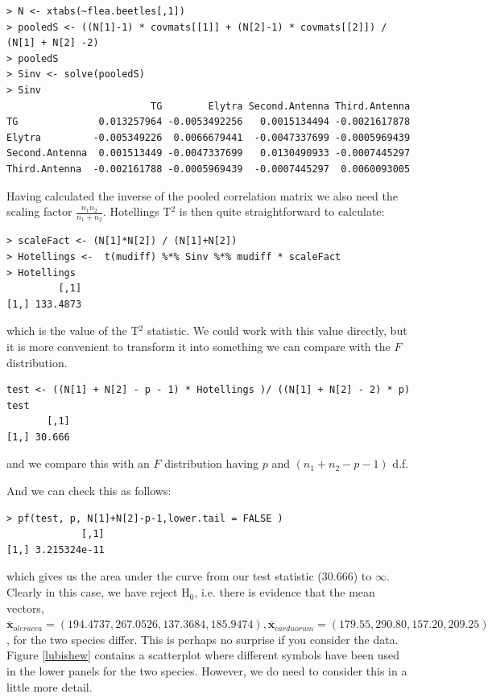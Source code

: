 \singlespacing
\begin{verbatim}
> N <- xtabs(~flea.beetles[,1])
> pooledS <- ((N[1]-1) * covmats[[1]] + (N[2]-1) * covmats[[2]]) / (N[1] + N[2] -2)
> pooledS
> Sinv <- solve(pooledS)
> Sinv
                         TG        Elytra Second.Antenna Third.Antenna
TG              0.013257964 -0.0053492256   0.0015134494 -0.0021617878
Elytra         -0.005349226  0.0066679441  -0.0047337699 -0.0005969439
Second.Antenna  0.001513449 -0.0047337699   0.0130490933 -0.0007445297
Third.Antenna  -0.002161788 -0.0005969439  -0.0007445297  0.0060093005
\end{verbatim}
\onehalfspacing

Having calculated the inverse of the pooled correlation matrix we also need the scaling factor $\frac{n_{1} n_{2}}{n_{1} + n_{2}}$.   Hotellings T$^{2}$ is then quite straightforward to calculate:


\singlespacing
\begin{verbatim}
> scaleFact <- (N[1]*N[2]) / (N[1]+N[2])
> Hotellings <-  t(mudiff) %*% Sinv %*% mudiff * scaleFact
> Hotellings
         [,1]
[1,] 133.4873
\end{verbatim}
\onehalfspacing
which is the value of the T$^{2}$ statistic.   We could work with this value directly, but it is more convenient to transform it into something we can compare with the $F$ distribution.
\singlespacing
\begin{verbatim}
test <- ((N[1] + N[2] - p - 1) * Hotellings )/ ((N[1] + N[2] - 2) * p)
test
       [,1]
[1,] 30.666
\end{verbatim}
\onehalfspacing

and we compare this with an $F$ distribution having $p$ and $(n_{1} + n_{2} - p - 1)$ d.f.

And we can check this as follows:
\singlespacing
\begin{verbatim}
> pf(test, p, N[1]+N[2]-p-1,lower.tail = FALSE )
             [,1]
[1,] 3.215324e-11
\end{verbatim}
\onehalfspacing
which gives us the area under the curve from our test statistic ($30.666$) to $\infty$.   Clearly in this case, we have reject H$_{0}$, i.e. there is evidence that the mean vectors, $\bar{\boldsymbol{x}}_{oleracea} = (194.4737, 267.0526, 137.3684, 185.9474), \bar{\boldsymbol{x}}_{carduorum} = (179.55, 290.80, 157.20, 209.25)$, 
 for the two species differ.   This is perhaps no surprise if you consider the data.   Figure \ref{lubishew} contains a scatterplot where different symbols have been used in the lower panels for the two species.   However, we do need to consider this in a little more detail.  

